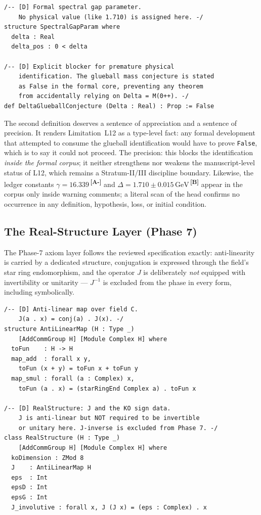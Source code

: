 \documentclass[12pt,a4paper,twoside]{article}
\theoremstyle{plain}
\theoremstyle{definition}
\theoremstyle{remark}
\newcommand{\GeV}{\,\mathrm{GeV}}
\newcommand{\catmark}[1]{\textsuperscript{\textsf{\textbf{[#1]}}}}
\newcommand{\DeltaGap}{1.710 \pm 0.015\GeV} %
\newcommand{\GammaGeom}{16.339} %
\begin{document}
\begin{lstlisting}
/-- [D] Formal spectral gap parameter.
    No physical value (like 1.710) is assigned here. -/
structure SpectralGapParam where
  delta : Real
  delta_pos : 0 < delta

/-- [D] Explicit blocker for premature physical
    identification. The glueball mass conjecture is stated
    as False in the formal core, preventing any theorem
    from accidentally relying on Delta = M(0++). -/
def DeltaGlueballConjecture (Delta : Real) : Prop := False
\end{lstlisting}

The second definition deserves a sentence of appreciation and a sentence
of precision. It renders Limitation~L12 as a type-level fact: any formal
development that attempted to consume the glueball identification would
have to prove \texttt{False}, which is to say it could not proceed. The
precision: this blocks the identification \emph{inside the formal corpus};
it neither strengthens nor weakens the manuscript-level status of L12,
which remains a Stratum-II/III discipline boundary. Likewise, the ledger
constants $\gamma = \GammaGeom$\,\catmark{A-} and
$\Delta = \DeltaGap$\,\catmark{B} appear in the corpus only inside warning
comments; a literal scan of the head confirms no occurrence in any
definition, hypothesis, loss, or initial condition.

\subsection{The Real-Structure Layer (Phase 7)}
\label{subsec:real-structure}

The Phase-7 axiom layer follows the reviewed specification exactly:
anti-linearity is carried by a dedicated structure, conjugation is
expressed through the field's star ring endomorphism, and the operator $J$
is deliberately \emph{not} equipped with invertibility or unitarity ---
$J^{-1}$ is excluded from the phase in every form, including symbolically.

\begin{lstlisting}
/-- [D] Anti-linear map over field C.
    J(a . x) = conj(a) . J(x). -/
structure AntiLinearMap (H : Type _)
    [AddCommGroup H] [Module Complex H] where
  toFun    : H -> H
  map_add  : forall x y,
    toFun (x + y) = toFun x + toFun y
  map_smul : forall (a : Complex) x,
    toFun (a . x) = (starRingEnd Complex a) . toFun x

/-- [D] RealStructure: J and the KO sign data.
    J is anti-linear but NOT required to be invertible
    or unitary here. J-inverse is excluded from Phase 7. -/
class RealStructure (H : Type _)
    [AddCommGroup H] [Module Complex H] where
  koDimension : ZMod 8
  J    : AntiLinearMap H
  eps  : Int
  epsD : Int
  epsG : Int
  J_involutive : forall x, J (J x) = (eps : Complex) . x
\end{lstlisting}
\end{document}
